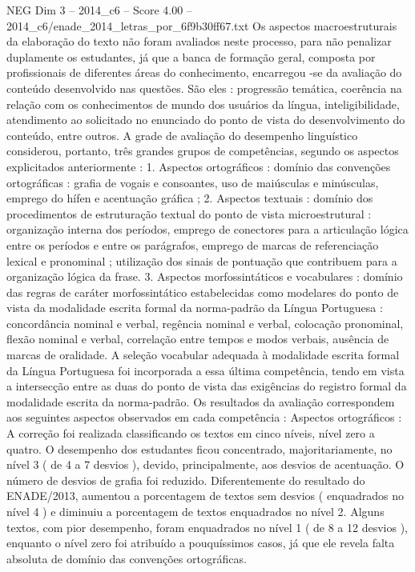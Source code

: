 \begin{textsample}{NEG Dim 3 – 2014\_c6 – Score 4.00 – 2014\_c6/enade\_2014\_letras\_por\_6f9b30ff67.txt}
Os aspectos macroestruturais da elaboração do texto não foram avaliados neste processo, para não penalizar duplamente os estudantes, já que a banca de formação geral, composta por profissionais de diferentes áreas do conhecimento, encarregou -se da avaliação do conteúdo desenvolvido nas questões.
São eles : progressão temática, coerência na relação com os conhecimentos de mundo dos usuários da língua, inteligibilidade, atendimento ao solicitado no enunciado do ponto de vista do desenvolvimento do conteúdo, entre outros.
A grade de avaliação do desempenho linguístico considerou, portanto, três grandes grupos de competências, segundo os aspectos explicitados anteriormente : 1.
Aspectos ortográficos : domínio das convenções ortográficas : grafia de vogais e consoantes, uso de maiúsculas e minúsculas, emprego do hífen e acentuação gráfica ; 2.
Aspectos textuais : domínio dos procedimentos de estruturação textual do ponto de vista microestrutural : organização interna dos períodos, emprego de conectores para a articulação lógica entre os períodos e entre os parágrafos, emprego de marcas de referenciação lexical e pronominal ; utilização dos sinais de pontuação que contribuem para a organização lógica da frase. 3.
Aspectos morfossintáticos e vocabulares : domínio das regras de caráter morfossintático estabelecidas como modelares do ponto de vista da modalidade escrita formal da norma-padrão da Língua Portuguesa : concordância nominal e verbal, regência nominal e verbal, colocação pronominal, flexão nominal e verbal, correlação entre tempos e modos verbais, ausência de marcas de oralidade.
A seleção vocabular adequada à modalidade escrita formal da Língua Portuguesa foi incorporada a essa última competência, tendo em vista a intersecção entre as duas do ponto de vista das exigências do registro formal da modalidade escrita da norma-padrão.
Os resultados da avaliação correspondem aos seguintes aspectos observados em cada competência : Aspectos ortográficos : A correção foi realizada classificando os textos em cinco níveis, nível zero a quatro.
O desempenho dos estudantes ficou concentrado, majoritariamente, no nível 3 ( de 4 a 7 desvios ), devido, principalmente, aos desvios de acentuação.
O número de desvios de grafia foi reduzido.
Diferentemente do resultado do ENADE/2013, aumentou a porcentagem de textos sem desvios ( enquadrados no nível 4 ) e diminuiu a porcentagem de textos enquadrados no nível 2.
Alguns textos, com pior desempenho, foram enquadrados no nível 1 ( de 8 a 12 desvios ), enquanto o nível zero foi atribuído a pouquíssimos casos, já que ele revela falta absoluta de domínio das convenções ortográficas.

\end{textsample}
